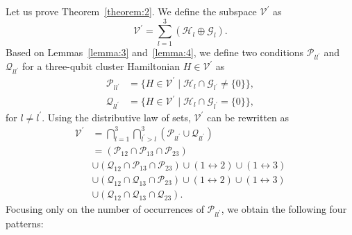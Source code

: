 \documentclass[aps,showpacs,amsmath,amssymb,twocolumn,prx,longbibliography,superscriptaddress,notitlepage,floatfix,10pt]{revtex4-2}
\begin{document}
Let us prove Theorem~\ref{theorem:2}. We define the subspace $\mathcal{V}^{\prime}$ as
\begin{equation}
    \mathcal{V}^{\prime}=\sum_{l=1}^{3}\left(\mathcal{H}_{l}\oplus\mathcal{G}_{l}\right).
\end{equation}
Based on Lemmas~\ref{lemma:3} and~\ref{lemma:4}, we define two conditions $\mathcal{P}_{ll^{\prime}}$ and $\mathcal{Q}_{ll^{\prime}}$ for a three-qubit cluster Hamiltonian $H\in\mathcal{V}^{\prime}$ as
\begin{equation}
\begin{split}
    \mathcal{P}_{ll^{\prime}}&=\{H\in\mathcal{V}^{\prime} \mid \mathcal{H}_{l}\cap\mathcal{G}_{l^{\prime}}\neq\{0\}\},\\
    \mathcal{Q}_{ll^{\prime}}&=\{H\in\mathcal{V}^{\prime} \mid \mathcal{H}_{l}\cap\mathcal{G}_{l^{\prime}}=\{0\}\},
\end{split}
\end{equation}
for $l\neq l^{\prime}$. Using the distributive law of sets, $\mathcal{V}^{\prime}$ can be rewritten as
\begin{equation}
\begin{split}
 \mathcal{V}^{\prime}&=\bigcap_{l=1}^{3}\bigcap_{l^{\prime}>l}^{3}(\mathcal{P}_{ll^{\prime}}\cup \mathcal{Q}_{ll^{\prime}})\\
    &=(\mathcal{P}_{12}\cap \mathcal{P}_{13}\cap \mathcal{P}_{23})\\
    &\cup(\mathcal{Q}_{12}\cap \mathcal{P}_{13}\cap \mathcal{P}_{23})\cup(1\leftrightarrow2)\cup(1\leftrightarrow3)\\
    &\cup(\mathcal{Q}_{12}\cap \mathcal{Q}_{13}\cap \mathcal{P}_{23})\cup(1\leftrightarrow2)\cup(1\leftrightarrow3)\\
    &\cup(\mathcal{Q}_{12}\cap \mathcal{Q}_{13}\cap \mathcal{Q}_{23}).
\end{split}
\label{eq:distributeset}
\end{equation}
Focusing only on the number of occurrences of $\mathcal{P}_{ll^{\prime}}$, we obtain the following four patterns:
\end{document}
